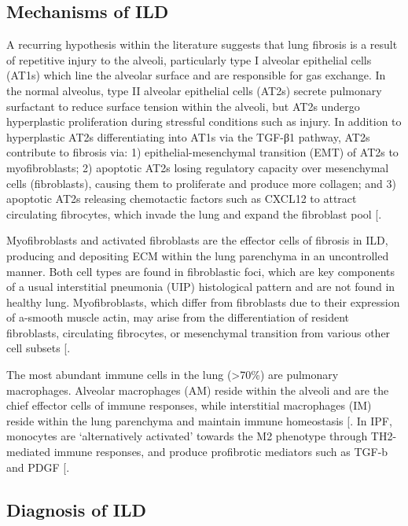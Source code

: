 \documentclass[
]{article}
\begin{document}
\subsection{Mechanisms of ILD}\label{mechanisms-of-ild}

A recurring hypothesis within the literature suggests that lung fibrosis is a result of repetitive injury to the alveoli, particularly type I alveolar epithelial cells (AT1s) which line the alveolar surface and are responsible for gas exchange. In the normal alveolus, type II alveolar epithelial cells (AT2s) secrete pulmonary surfactant to reduce surface tension within the alveoli, but AT2s undergo hyperplastic proliferation during stressful conditions such as injury. In addition to hyperplastic AT2s differentiating into AT1s via the TGF-β1 pathway, AT2s contribute to fibrosis via: 1) epithelial-mesenchymal transition (EMT) of AT2s to myofibroblasts; 2) apoptotic AT2s losing regulatory capacity over mesenchymal cells (fibroblasts), causing them to proliferate and produce more collagen; and 3) apoptotic AT2s releasing chemotactic factors such as CXCL12 to attract circulating fibrocytes, which invade the lung and expand the fibroblast pool {[}\citeproc{ref-bagnato_cellular_2015}{9}{]}.

Myofibroblasts and activated fibroblasts are the effector cells of fibrosis in ILD, producing and depositing ECM within the lung parenchyma in an uncontrolled manner. Both cell types are found in fibroblastic foci, which are key components of a usual interstitial pneumonia (UIP) histological pattern and are not found in healthy lung. Myofibroblasts, which differ from fibroblasts due to their expression of a-smooth muscle actin, may arise from the differentiation of resident fibroblasts, circulating fibrocytes, or mesenchymal transition from various other cell subsets {[}\citeproc{ref-marconi_epithelial-mesenchymal_2021}{10}{]}.

The most abundant immune cells in the lung (\textgreater70\%) are pulmonary macrophages. Alveolar macrophages (AM) reside within the alveoli and are the chief effector cells of immune responses, while interstitial macrophages (IM) reside within the lung parenchyma and maintain immune homeostasis {[}\citeproc{ref-byrne_pulmonary_2015}{11}{]}. In IPF, monocytes are `alternatively activated' towards the M2 phenotype through TH2-mediated immune responses, and produce profibrotic mediators such as TGF-b and PDGF {[}\citeproc{ref-zhu_m2_2017}{12}{]}.

\subsection{Diagnosis of ILD}\label{diagnosis-of-ild}
\end{document}
